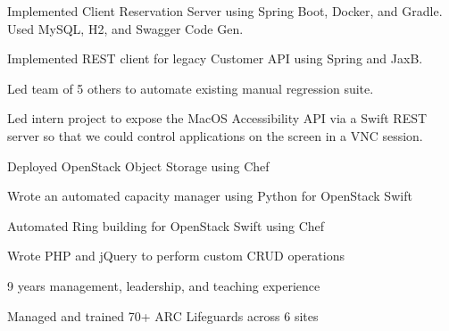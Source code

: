 \documentclass[letterpaper]{resume} %
\begin{document}
\begin{minipage}[t]{0.66\textwidth}
\begin{tightitemize}
    \item Implemented Client Reservation Server using Spring Boot, Docker, and Gradle.  Used MySQL, H2, and Swagger Code Gen.
    \item Implemented REST client for legacy Customer API using Spring and JaxB.
    \item Led team of 5 others to automate existing manual regression suite.
    \item Led intern project to expose the MacOS Accessibility API via a Swift REST server so that we could control applications on the screen in a VNC session.
\end{tightitemize}%

\begin{tightitemize}
    \item Deployed OpenStack Object Storage using Chef
    \item Wrote an automated capacity manager using Python for OpenStack Swift
    \item Automated Ring building for OpenStack Swift using Chef
\end{tightitemize} %



\begin{tightitemize}
    \item Wrote PHP and jQuery to perform custom CRUD operations
\end{tightitemize} %


\begin{tightitemize}
    \item 9 years management, leadership, and teaching experience
    \item Managed and trained 70+ ARC Lifeguards across 6 sites
\end{tightitemize}


\end{minipage}
\end{document}
